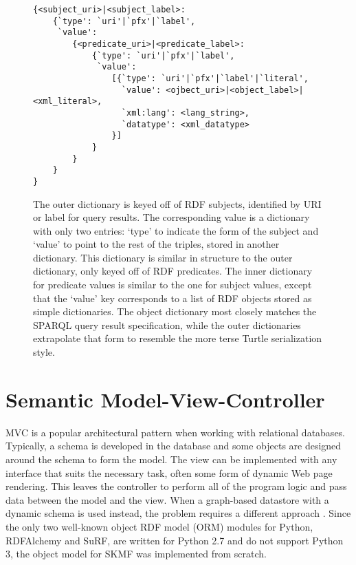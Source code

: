 \begin{figure}[p]
\singlespace
\begin{verbatim}
{<subject_uri>|<subject_label>:
    {`type': `uri'|`pfx'|`label',
     `value':
        {<predicate_uri>|<predicate_label>:
            {`type': `uri'|`pfx'|`label',
             `value':
                [{`type': `uri'|`pfx'|`label'|`literal',
                  `value': <ojbect_uri>|<object_label>|<xml_literal>,
                  `xml:lang': <lang_string>,
                  `datatype': <xml_datatype>
                }]
            }
        }
    }
}
\end{verbatim}
\caption[Structure of a triple in SKMF]
 {\narrower The outer dictionary is keyed off of RDF subjects, identified by URI or label for query results. The corresponding value is a dictionary with only two entries: `type' to indicate the form of the subject and `value' to point to the rest of the triples, stored in another dictionary. This dictionary is similar in structure to the outer dictionary, only keyed off of RDF predicates. The inner dictionary for predicate values is similar to the one for subject values, except that the `value' key corresponds to a list of RDF objects stored as simple dictionaries. The object dictionary most closely matches the SPARQL query result specification, while the outer dictionaries extrapolate that form to resemble the more terse Turtle serialization style.
 }
\label{skmf-triple}
\end{figure}



\section{Semantic Model-View-Controller}

MVC is a popular architectural pattern when working with relational databases. Typically, a schema is developed in the database and some objects are designed around the schema to form the model. The view can be implemented with any interface that suits the necessary task, often some form of dynamic Web page rendering. This leaves the controller to perform all of the program logic and pass data between the model and the view. When a graph-based datastore with a dynamic schema is used instead, the problem requires a different approach
\cite{semanticwebprogram}.
Since the only two well-known object RDF model (ORM) modules for Python, RDFAlchemy and SuRF, are written for Python 2.7 and do not support Python 3, the object model for SKMF was implemented from scratch.


